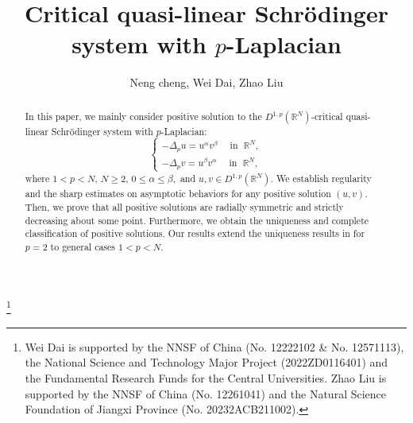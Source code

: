 \documentclass[12pt]{amsart}
\theoremstyle{definition}
\theoremstyle{remark}
\theoremstyle{conclusion}
\theoremstyle{conjecture}
\numberwithin{equation}{section}
\newcommand{\R}{\mathbb{R}}
\begin{document}
\title[Classification results for critical Schr\"{o}dinger system]{Critical quasi-linear Schr\"{o}dinger system with $p$-Laplacian}

\author{Neng cheng, Wei Dai, Zhao Liu}

\address{School of Mathematical Sciences, Jiangxi Science and Technology Normal University, Nanchang 330038, P. R. China}

\address{School of Mathematical Sciences, Beihang University (BUAA), Beijing 100191, P. R. China, and Key Laboratory of Mathematics, Informatics and Behavioral Semantics, Ministry of Education, Beijing 100191, P. R. China}

\address{School of Mathematical Sciences, Jiangxi Science and Technology Normal University, Nanchang 330038, P. R. China}

\thanks{Wei Dai is supported by the NNSF of China (No. 12222102 \& No. 12571113), the National Science and Technology Major Project (2022ZD0116401) and the Fundamental Research Funds for the Central Universities. Zhao Liu is supported by the NNSF of China (No. 12261041) and the Natural Science Foundation of Jiangxi Province (No. 20232ACB211002).}


\begin{abstract}
In this paper, we mainly consider positive solution to the $D^{1,p}(\R^{N})$-critical quasi-linear Schr\"{o}dinger system with $p$-Laplacian:
\begin{equation*}\begin{cases}
-\Delta_p u = u^{\alpha}v^{\beta}  \, \ \ \ \ \ \text{in}\,\ \ \R^N, \\
-\Delta_p v = u^{\beta}v^{\alpha}  \,\  \ \ \ \ \text{in}\,\ \ \R^N,
\end{cases}\end{equation*}
where $1<p<N$, $N\geq2$, $0\leq \alpha \leq \beta,$ and $u,v\in D^{1,p}(\R^N)$. We establish regularity and the sharp estimates on asymptotic behaviors for any positive solution $(u,v)$. Then, we prove that all positive solutions are radially symmetric and strictly decreasing about some point. Furthermore, we obtain the uniqueness and complete classification of positive solutions. Our results extend the uniqueness results in \cite{LM,QS} for $p=2$ to general cases $1<p<N$.
\end{abstract}

\end{document}
